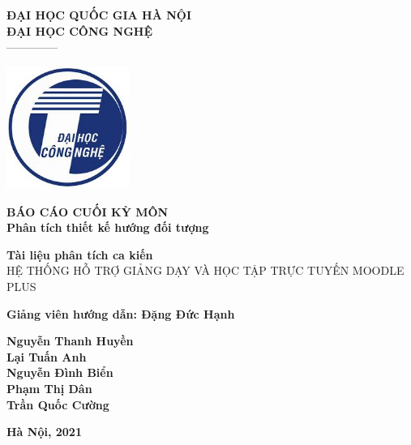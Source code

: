 \documentclass[./main.tex]{subfiles}
\begin{document}
\begin{titlepage}	
	\begin{center}
		\textbf{ĐẠI HỌC QUỐC GIA HÀ NỘI}\\
		\textbf{ĐẠI HỌC CÔNG NGHỆ}\\
		--------------
	
		\vspace*{30pt}
		
		\includegraphics[width=0.3\textwidth]{./images/uet.jpg}
		
		\vspace*{50pt}
		
		\textbf{BÁO CÁO CUỐI KỲ MÔN 
			\\ Phân tích thiết kế hướng đối tượng}
		\vspace*{30pt}
		
		\textbf{Tài liệu phân tích ca kiến\\}
		{\Large HỆ THỐNG HỖ TRỢ GIẢNG DẠY VÀ HỌC TẬP TRỰC TUYẾN MOODLE PLUS}
		
		\vspace*{50pt}
		
		\textbf{Giảng viên hướng dẫn: Đặng Đức Hạnh}
		
		\vspace*{30pt}
		
		\textbf{Nguyễn Thanh Huyền\\
			Lại Tuấn Anh\\
			Nguyễn Đình Biển\\
			Phạm Thị Dân\\
			Trần Quốc Cường\\
		}
		
		\vspace*{40pt}
	\end{center}
	
	
	\begin{center}
		\textbf{Hà Nội, 2021}
	\end{center}
\end{titlepage}
\end{document}
